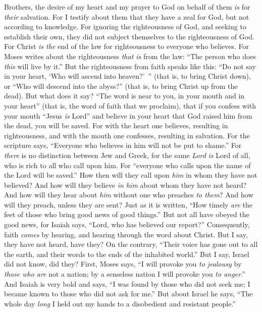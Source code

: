 \begin{biblechapter} %
 Brothers, the desire of my heart and my prayer to God on behalf of them \textit{is} for \textit{their} salvation.
\verse For I testify about them that they have a zeal for God, but not according to knowledge.
\verse For ignoring the righteousness of God, and seeking to establish their own, they did not subject themselves to the righteousness of God.
\verse For Christ \textit{is the} end of the law for righteousness to everyone who believes.
\verse For Moses writes about the righteousness \textit{that is} from the law: “The person who does \textit{this} will live by it.”
\verse But the righteousness from faith speaks like this: “Do not say in your heart, ‘Who will ascend into heaven?’ ” (that is, to bring Christ down),
\verse or “Who will descend into the abyss?” (that is, to bring Christ up from the dead).
\verse But what does it say? “The word is near to you, in your mouth and in your heart” (that is, the word of faith that we proclaim),
\verse that if you confess with your mouth “Jesus \textit{is} Lord” and believe in your heart that God raised him from the dead, you will be saved.
\verse For with the heart one believes, resulting in righteousness, and with the mouth one confesses, resulting in salvation.
\verse For the scripture says, “Everyone who believes in him will not be put to shame.”
\verse For \textit{there} is no distinction between Jew and Greek, for the same \textit{Lord} \textit{is} Lord of all, who is rich to all who call upon him.
\verse For “everyone who calls upon the name of the Lord will be saved.”
\verse How then will they call upon \textit{him} in whom they have not believed? And how will they believe \textit{in him} about whom they have not heard? And how will they hear about \textit{him} without one who preaches \textit{to them}?
\verse And how will they preach, unless they are sent? Just as it is written, “How timely \textit{are} the feet of those who bring good news of good things.”
\verse But not all have obeyed the good news, for Isaiah says, “Lord, who has believed our report?”
\verse Consequently, faith \textit{comes} by hearing, and hearing through the word about Christ.
\verse But I say, they have not heard, have they? On the contrary, “Their voice has gone out to all the earth, 
and their words to the ends of the inhabited world.”
\verse But I say, Israel did not know, did they? First, Moses says, “I will provoke you \textit{to jealousy} by \textit{those who are} not a nation; 
by a senseless nation I will provoke you \textit{to anger}.”
\verse And Isaiah is very bold and says, “I was found by those who did not seek me; 
I became known to those who did not ask for me.”
\verse But about Israel he says, “The whole day \textit{long} I held out my hands 
to a disobedient and resistant people.”
\end{biblechapter}

